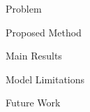 \documentclass{beamer}
\begin{document}
\begin{frame}{Problem}

\end{frame}


\begin{frame}{Proposed Method}

\end{frame}


\begin{frame}{Main Results}

\end{frame}


\begin{frame}{Model Limitations}

\end{frame}



\begin{frame}{Future Work}

\end{frame}
\end{document}
